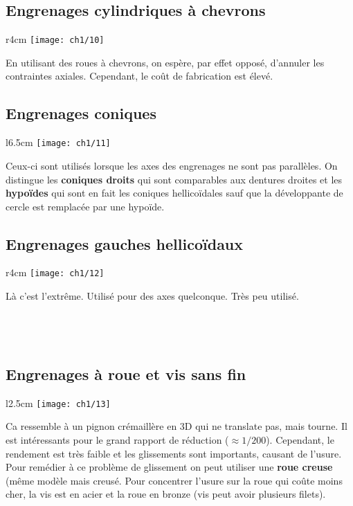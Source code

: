\subsection{Engrenages cylindriques à chevrons}
	\begin{wrapfigure}[4]{r}{4cm}
	\vspace{-5mm}
	\texttt{[image: ch1/10]}
	\end{wrapfigure}	
	\noindent En utilisant des roues à chevrons, on espère, par effet opposé, d'annuler les contraintes axiales. Cependant, le coût de fabrication est élevé. \\
	
\subsection{Engrenages coniques}
	\begin{wrapfigure}[6]{l}{6.5cm}
	\vspace{-5mm}
	\texttt{[image: ch1/11]}
	\end{wrapfigure}	
	\noindent Ceux-ci sont utilisés lorsque les axes des engrenages ne sont pas parallèles. On distingue les \textbf{coniques droits} qui sont comparables aux dentures droites et les \textbf{hypoïdes} qui sont en fait les coniques hellicoïdales sauf que la développante de cercle est remplacée par une hypoïde.
	
\subsection{Engrenages gauches hellicoïdaux}
	\begin{wrapfigure}[2]{r}{4cm}
	\vspace{-5mm}
	\texttt{[image: ch1/12]}
	\end{wrapfigure}	
	\noindent Là c'est l'extrême. Utilisé pour des axes quelconque. Très peu utilisé. \\\\\\\\

\subsection{Engrenages à roue et vis sans fin}
	\begin{wrapfigure}[6]{l}{2.5cm}
	\vspace{-5mm}
	\texttt{[image: ch1/13]}
	\end{wrapfigure}	
	\noindent Ca ressemble à un pignon crémaillère en 3D qui ne translate pas, mais tourne. Il est intéressants pour le grand rapport de réduction ($\approx 1/200$). Cependant, le rendement est très faible et les glissements sont importants, causant de l'usure. Pour remédier à ce problème de glissement on peut utiliser une \textbf{roue creuse} (même modèle mais creusé. Pour concentrer l'usure sur la roue qui coûte moins cher, la vis est en acier et la roue en bronze (vis peut avoir plusieurs filets). \\
	
